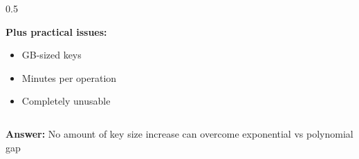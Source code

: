 \documentclass[aspectratio=169,10pt]{beamer}
\newcommand{\teaching}[1]{}
\theoremstyle{plain}
\begin{document}
\begin{frame}
\begin{columns}[T]
\begin{column}{0.5\textwidth}
    
    \vspace{0.3cm}
    
    \textbf{Plus practical issues:}
    \begin{itemize}
      \item GB-sized keys
      \item Minutes per operation
      \item Completely unusable
    \end{itemize}
  
    \end{column}
  \end{columns}
  
  \vspace{0.3cm}
  
  \begin{redBox}
    \textbf{Answer:} No amount of key size increase can overcome exponential vs polynomial gap
  \end{redBox}
  
  \teaching{Address common misconception}
\end{frame}
\end{document}
